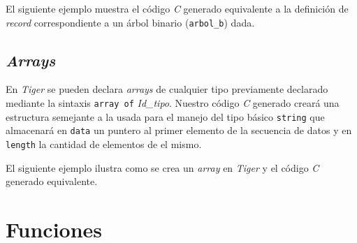 \documentclass{article}
\begin{document}
El siguiente ejemplo muestra el código \textit{C} generado equivalente a la
definición de \textit{record} correspondiente a un árbol binario
(\texttt{arbol\_b}) dada.

\begin{quote}

\end{quote}

\begin{quote}

\end{quote}

\subsection{\emph{Arrays}}

En \textit{Tiger} se pueden declara \textit{arrays} de cualquier tipo
previamente declarado mediante la sintaxis \texttt{array of} \textit{Id\_tipo}.
Nuestro código \textit{C} generado creará una estructura semejante a la usada
para el manejo del tipo básico \texttt{string} que almacenará en \texttt{data}
un puntero al primer elemento de la secuencia de datos y en \texttt{length} la
cantidad de elementos de el mismo.

El siguiente ejemplo ilustra como se crea un \textit{array} en \textit{Tiger} y
el código \textit{C} generado equivalente.

\begin{quote}

\end{quote}

\begin{quote}

\end{quote}

\section{Funciones}




\end{document}
